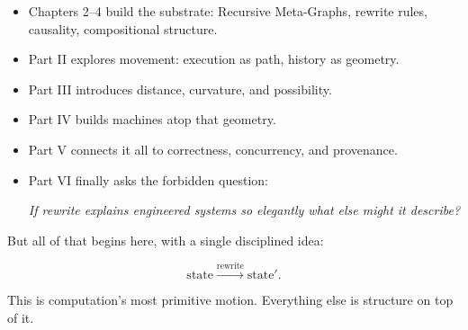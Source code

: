 \begin{itemize}
    \item Chapters 2–4 build the substrate: Recursive Meta-Graphs, rewrite rules,
    causality, compositional structure.
    \item Part II explores movement: execution as path, history as geometry.
    \item Part III introduces distance, curvature, and possibility.
    \item Part IV builds machines atop that geometry.
    \item Part V connects it all to correctness, concurrency, and provenance.
    \item Part VI finally asks the forbidden question:  
    \begin{center}
        \emph{If rewrite explains engineered systems so elegantly\emdash{}  
        what else might it describe?}
    \end{center}
\end{itemize}

But all of that begins here, with a single disciplined idea:

\[
\text{state} \xrightarrow{\text{rewrite}} \text{state}'.
\]

This is computation’s most primitive motion.  
Everything else is structure on top of it.

    